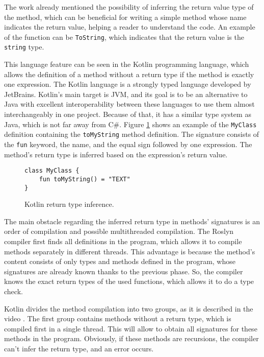 The work already mentioned the possibility of inferring the return value type of the method, which can be beneficial for writing a simple method whose name indicates the return value, helping a reader to understand the code. 
An example of the function can be \texttt{ToString}, which indicates that the return value is the \texttt{string} type.
\par
This language feature can be seen in the Kotlin programming language, which allows the definition of a method without a return type if the method is exactly one expression. 
The Kotlin language is a strongly typed language developed by JetBrains. 
Kotlin’s main target is JVM, and its goal is to be an alternative to Java with excellent interoperability between these languages to use them almost interchangeably in one project. 
Because of that, it has a similar type system as Java, which is not far away from C\#. 
Figure \ref{img64:kotlin} shows an example of the \texttt{MyClass} definition containing the \texttt{toMyString} method definition. 
The signature consists of the \texttt{fun} keyword, the name, and the equal sign followed by one expression. 
The method's return type is inferred based on the expression's return value.
\begin{figure}[h!]
\begin{lstlisting}[style=csharp, mathescape=true]
class MyClass {
    fun toMyString() = "TEXT"
}
\end{lstlisting}
\caption{Kotlin return type inference.}
\label{img64:kotlin}
\end{figure}
\par
The main obstacle regarding the inferred return type in methods' signatures is an order of compilation and possible multithreaded compilation.
The Roslyn compiler first finds all definitions in the program, which allows it to compile methods separately in different threads.
This advantage is because the method's content consists of only types and methods defined in the program, whose signatures are already known thanks to the previous phase.
So, the compiler knows the exact return types of the used functions, which allows it to do a type check.
\par
Kotlin divides the method compilation into two groups, as it is described in the video \cite{online:kotlinCompiler}. 
The first group contains methods without a return type, which is compiled first in a single thread. 
This will allow to obtain all signatures for these methods in the program. 
Obviously, if these methods are recursions, the compiler can’t infer the return type, and an error occurs.
